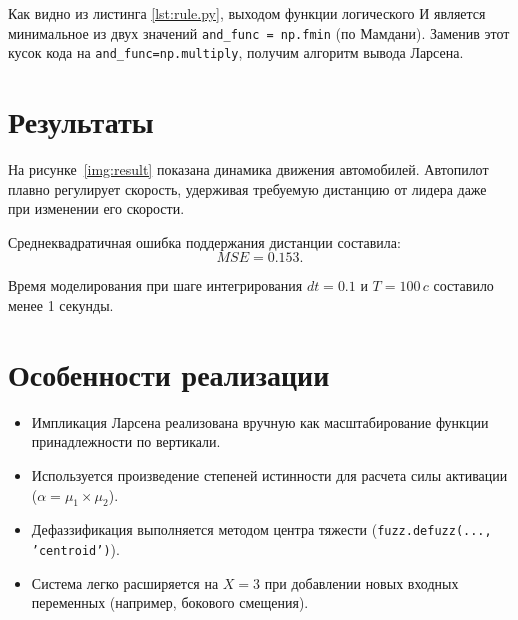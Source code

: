 Как видно из листинга \ref{lst:rule.py}, выходом функции логического И является 
минимальное из двух значений \lstinline|and_func = np.fmin| (по Мамдани).
Заменив этот кусок кода на \lstinline|and_func=np.multiply|, получим алгоритм вывода
Ларсена.

\section{Результаты}

На рисунке~\ref{img:result} показана динамика движения автомобилей.  
Автопилот плавно регулирует скорость, удерживая требуемую дистанцию от лидера даже при изменении его скорости.


Среднеквадратичная ошибка поддержания дистанции составила:
\[
MSE = 0.153.
\]

Время моделирования при шаге интегрирования \( dt = 0.1 \) и \( T = 100 \, c \) составило менее 1 секунды.

\section{Особенности реализации}

\begin{itemize}
    \item Импликация Ларсена реализована вручную как масштабирование функции принадлежности по вертикали.
    \item Используется произведение степеней истинности для расчета силы активации (\( \alpha = \mu_1 \times \mu_2 \)).
    \item Дефаззификация выполняется методом центра тяжести (\texttt{fuzz.defuzz(..., 'centroid')}).
    \item Система легко расширяется на \( X=3 \) при добавлении новых входных переменных (например, бокового смещения).
\end{itemize}
